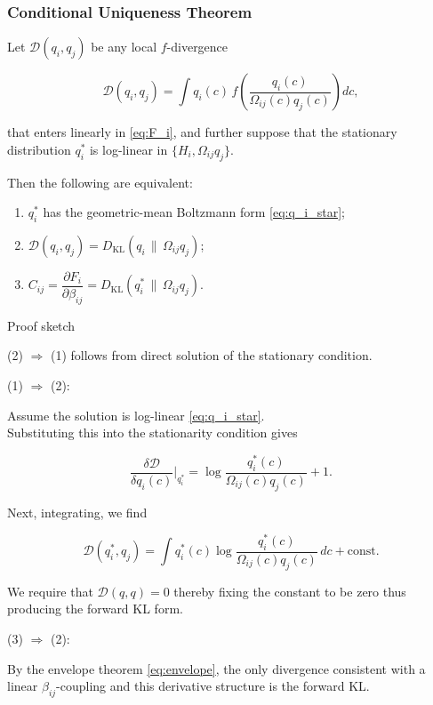 \documentclass[11pt]{article}
\begin{document}
\subsubsection{Conditional Uniqueness Theorem}
Let $\mathcal{D}(q_i,q_j)$ be any local $f$-divergence

\[
\mathcal{D}(q_i,q_j)
= \int q_i(c)\,
f\!\left(\frac{q_i(c)}{\Omega_{ij}(c) q_j(c)}\right)
dc,
\]

that enters linearly in \eqref{eq:F_i}, and further suppose that the stationary distribution $q_i^*$ is log-linear in $\{H_i,\Omega_{ij}q_j\}$.

Then the following are equivalent:

\begin{enumerate}
  \item $q_i^*$ has the geometric-mean Boltzmann form \eqref{eq:q_i_star};
  \item $\mathcal{D}(q_i,q_j)=D_{\mathrm{KL}}(q_i \,\|\, \Omega_{ij} q_j)$;
  \item $C_{ij}=\dfrac{\partial F_i}{\partial\beta_{ij}}
=D_{\mathrm{KL}}(q_i^* \,\|\, \Omega_{ij}q_j).$
\end{enumerate}

Proof sketch

(2) $\Rightarrow$ (1) follows from direct solution of the stationary condition.

(1) $\Rightarrow$ (2):

Assume the solution is log-linear \eqref{eq:q_i_star}.\\
Substituting this into the stationarity condition gives

\[
\frac{\delta \mathcal{D}}{\delta q_i(c)}
\Big|_{q_i^*}
= \log\frac{q_i^*(c)}{\Omega_{ij}(c) q_j(c)} + 1.
\]

Next, integrating, we find

\[
\mathcal{D}(q_i^*,q_j)
= \int q_i^*(c)
\log\frac{q_i^*(c)}{\Omega_{ij}(c) q_j(c)}\,dc
+ \text{const}.
\]

We require that $\mathcal{D}(q,q)=0$ thereby fixing the constant to be zero thus producing the forward KL form.

(3) $\Rightarrow$ (2):

By the envelope theorem \eqref{eq:envelope}, the only divergence consistent with a linear $\beta_{ij}$-coupling and this derivative structure is the forward KL.
\end{document}
